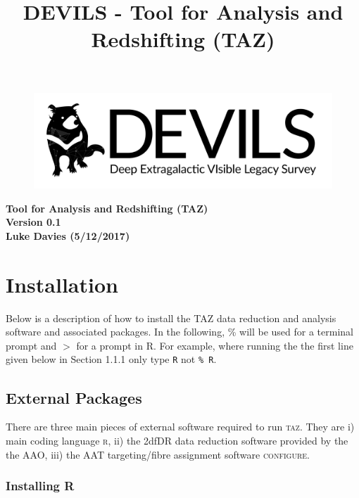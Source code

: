 \documentclass[12pt]{article}
\begin{document}
\title{DEVILS - Tool for Analysis and Redshifting (TAZ) }


\begin{figure}
\begin{center}
\includegraphics[scale=0.8]{devils-logo_big.png}
\end{center}
\end{figure}

\begin{center}
\Huge {\textcolor{PineGreen}{\textbf{Tool for Analysis and Redshifting (TAZ)}}}\\
\Huge {\textcolor{PineGreen}{\textbf{ Version 0.1}}}\\
\Large \textbf{Luke Davies (5/12/2017)}\\
\end{center}
\normalsize


\section{Installation}

Below is a description of how to install the TAZ data reduction and analysis software and associated packages. In the following, \% will be used for a terminal prompt and $>$ for a prompt in R. For example, where running the the first line given below in Section 1.1.1 only type \texttt{R} not \texttt{\% R}. 

\subsection{External Packages}

There are three main pieces of external software required to run \textsc{taz}. They are i) main coding language \textsc{r}, ii) the 2dfDR data reduction software provided by the the AAO, iii) the AAT targeting/fibre assignment software \textsc{configure}. 

\subsubsection{Installing R}
\end{document}
